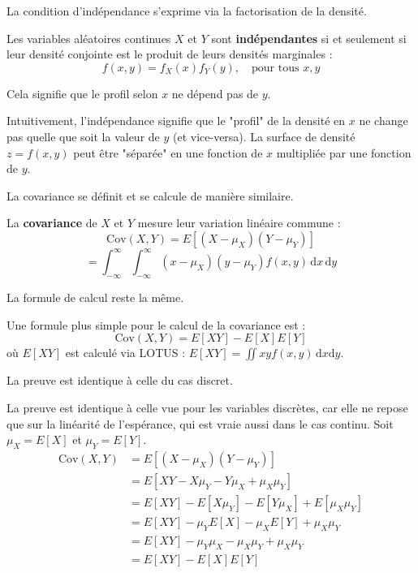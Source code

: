 La condition d'indépendance s'exprime via la factorisation de la densité.

\begin{definitionbox}
Les variables aléatoires continues $X$ et $Y$ sont \textbf{indépendantes} si et seulement si leur densité conjointe est le produit de leurs densités marginales :
$$ f(x, y) = f_X(x) f_Y(y), \quad \text{pour tous } x, y $$
\end{definitionbox}

Cela signifie que le profil selon $x$ ne dépend pas de $y$.

\begin{intuitionbox}
Intuitivement, l'indépendance signifie que le "profil" de la densité en $x$ ne change pas quelle que soit la valeur de $y$ (et vice-versa). La surface de densité $z=f(x,y)$ peut être "séparée" en une fonction de $x$ multipliée par une fonction de $y$.
\end{intuitionbox}

La covariance se définit et se calcule de manière similaire.

\begin{definitionbox}
La \textbf{covariance} de $X$ et $Y$ mesure leur variation linéaire commune :
$$ \text{Cov}(X, Y) = E[(X - \mu_X)(Y - \mu_Y)] $$
$$ = \int_{-\infty}^{\infty} \int_{-\infty}^{\infty} (x - \mu_X)(y - \mu_Y) f(x, y) \, \mathrm{d}x \, \mathrm{d}y $$
\end{definitionbox}

La formule de calcul reste la même.

\begin{theorembox}
Une formule plus simple pour le calcul de la covariance est :
$$ \text{Cov}(X, Y) = E[XY] - E[X]E[Y] $$
où $E[XY]$ est calculé via LOTUS : $E[XY] = \iint xy f(x, y) \, \mathrm{d}x \mathrm{d}y$.
\end{theorembox}

La preuve est identique à celle du cas discret.

\begin{proofbox}
La preuve est identique à celle vue pour les variables discrètes, car elle ne repose que sur la linéarité de l'espérance, qui est vraie aussi dans le cas continu.
Soit $\mu_X = E[X]$ et $\mu_Y = E[Y]$.
\begin{align*}
\text{Cov}(X,Y) &= E[(X - \mu_X)(Y - \mu_Y)] \\
&= E[XY - X\mu_Y - Y\mu_X + \mu_X\mu_Y] \\
&= E[XY] - E[X\mu_Y] - E[Y\mu_X] + E[\mu_X\mu_Y] \\
&= E[XY] - \mu_Y E[X] - \mu_X E[Y] + \mu_X\mu_Y \\
&= E[XY] - \mu_Y \mu_X - \mu_X \mu_Y + \mu_X\mu_Y \\
&= E[XY] - E[X]E[Y]
\end{align*}
\end{proofbox}

